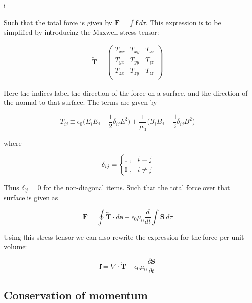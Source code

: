 i\documentclass[a4paper]{article}
\begin{document}
Such that the total force is given by $\bm{F}=\int \bm{f}\,d\tau$. This expression is to be simplified by introducing the Maxwell stress tensor:

\begin{gather}
    \overleftrightarrow{\bm{T}}
    = 
    \begin{pmatrix}
        T_{xx}& T_{xy} & T_{xz}\\
        T_{yx} & T_{yy} & T_{yz}\\
        T_{zx} & T_{zy} & T_{zz}\\
    \end{pmatrix}
\end{gather}

Here the indices label the direction of the force on a surface, and the direction of the normal to that surface. The terms are given by

\begin{equation}
    T_{ij}\equiv \epsilon_0\bigg(E_iE_j-\frac{1}{2}\delta_{ij}E^2\bigg)+\frac{1}{\mu_0}\bigg(B_iB_j-\frac{1}{2}\delta_{ij}B^2\bigg)
\end{equation}

where 

\begin{equation}
    \delta_{ij}
    =
    \begin{dcases}
        1\ ,\ \ i=j \\
        0\ ,\ \ i\not=j \\
    \end{dcases}
\end{equation}

Thus $\delta_{ij}=0$ for the non-diagonal items.
Such that the total force over that surface is given as

\begin{equation}
    \bm{F}=\oint \overleftrightarrow{\bm{T}}\cdot d\bm{a}-\epsilon_0\mu_0\frac{d}{dt}\int\bm{S}\,d\tau
\end{equation}

Using this stress tensor we can also rewrite the expression for the force per unit volume:

\begin{equation}
        \bm{f} =\nabla\cdot\overleftrightarrow{\bm{T}} -\epsilon_0\mu_0\frac{\partial\bm{S}}{\partial t}
\end{equation}

\subsection{Conservation of momentum}
\end{document}
